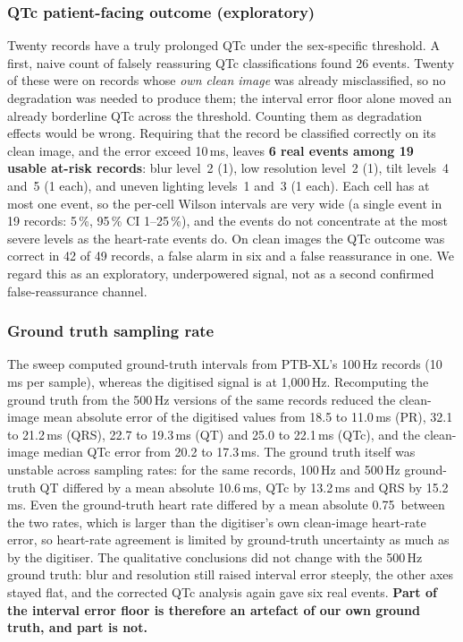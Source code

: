 \subsubsection{QTc patient-facing outcome (exploratory)}\label{sec:qtcoutcome}
Twenty records have a truly prolonged QTc under the sex-specific threshold. A first, naive count of falsely reassuring QTc classifications found 26 events. Twenty of these were on records whose \emph{own clean image} was already misclassified, so no degradation was needed to produce them; the interval error floor alone moved an already borderline QTc across the threshold. Counting them as degradation effects would be wrong. Requiring that the record be classified correctly on its clean image, and the error exceed 10\,ms, leaves \textbf{6 real events among 19 usable at-risk records}: blur level~2 (1), low resolution level~2 (1), tilt levels~4 and~5 (1 each), and uneven lighting levels~1 and~3 (1 each). Each cell has at most one event, so the per-cell Wilson intervals are very wide (a single event in 19 records: 5\,\%, 95\,\% CI 1--25\,\%), and the events do not concentrate at the most severe levels as the heart-rate events do. On clean images the QTc outcome was correct in 42 of 49 records, a false alarm in six and a false reassurance in one. We regard this as an exploratory, underpowered signal, not as a second confirmed false-reassurance channel.

\subsubsection{Ground truth sampling rate}\label{sec:gt500}
The sweep computed ground-truth intervals from PTB-XL's 100\,Hz records (10\,ms per sample), whereas the digitised signal is at 1{,}000\,Hz. Recomputing the ground truth from the 500\,Hz versions of the same records reduced the clean-image mean absolute error of the digitised values from 18.5 to 11.0\,ms (PR), 32.1 to 21.2\,ms (QRS), 22.7 to 19.3\,ms (QT) and 25.0 to 22.1\,ms (QTc), and the clean-image median QTc error from 20.2 to 17.3\,ms. The ground truth itself was unstable across sampling rates: for the same records, 100\,Hz and 500\,Hz ground-truth QT differed by a mean absolute 10.6\,ms, QTc by 13.2\,ms and QRS by 15.2\,ms. Even the ground-truth heart rate differed by a mean absolute 0.75\bpm\ between the two rates, which is larger than the digitiser's own clean-image heart-rate error, so heart-rate agreement is limited by ground-truth uncertainty as much as by the digitiser. The qualitative conclusions did not change with the 500\,Hz ground truth: blur and resolution still raised interval error steeply, the other axes stayed flat, and the corrected QTc analysis again gave six real events. \textbf{Part of the interval error floor is therefore an artefact of our own ground truth, and part is not.}

